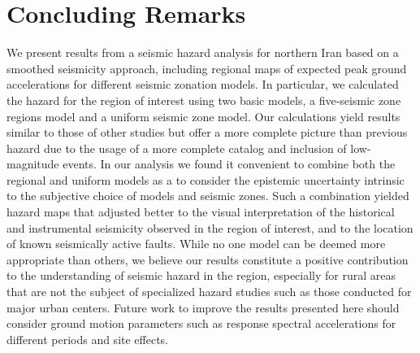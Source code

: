 
\section{Concluding Remarks}

We present results from a seismic hazard analysis for northern Iran based on a smoothed seismicity approach, including regional maps of expected peak ground accelerations for different seismic zonation models. In particular, we calculated the hazard for the region of interest using two basic models, a five-seismic zone regions model and a uniform seismic zone model. Our calculations yield results similar to those of other studies but offer a more complete picture than previous hazard  due to the usage of a more complete catalog and inclusion of low-magnitude events. In our analysis we found it convenient to combine both the regional and uniform models as a  to consider the epistemic uncertainty intrinsic to the subjective choice of models and seismic zones. Such a combination yielded hazard maps that adjusted better to the visual interpretation of the historical and instrumental seismicity observed in the region of interest, and to the location of known seismically active faults. While no one model can be deemed more appropriate than others, we believe our results constitute a positive contribution to the understanding of seismic hazard in the region, especially for rural areas that are not the subject of specialized hazard studies such as those conducted for major urban centers. Future work to improve the results presented here should consider  ground motion parameters such as response spectral accelerations for different periods and site effects.


